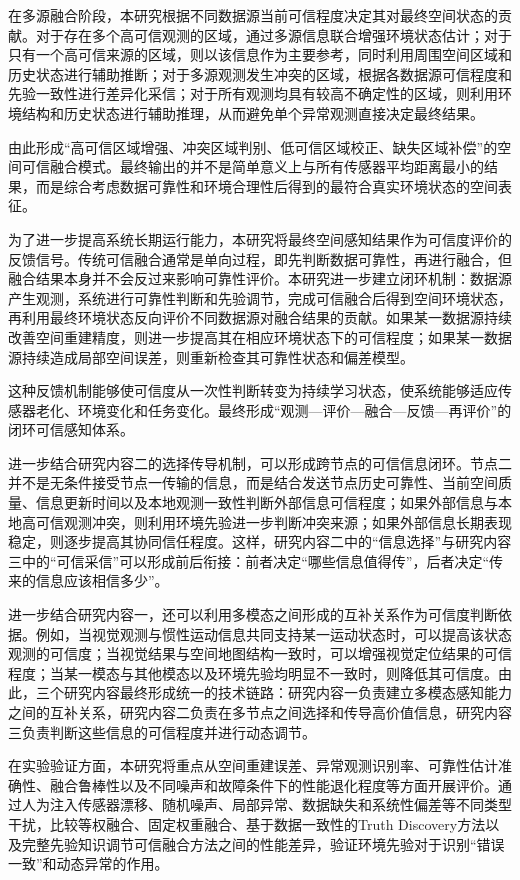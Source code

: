 在多源融合阶段，本研究根据不同数据源当前可信程度决定其对最终空间状态的贡献。对于存在多个高可信观测的区域，通过多源信息联合增强环境状态估计；对于只有一个高可信来源的区域，则以该信息作为主要参考，同时利用周围空间区域和历史状态进行辅助推断；对于多源观测发生冲突的区域，根据各数据源可信程度和先验一致性进行差异化采信；对于所有观测均具有较高不确定性的区域，则利用环境结构和历史状态进行辅助推理，从而避免单个异常观测直接决定最终结果。

由此形成“高可信区域增强、冲突区域判别、低可信区域校正、缺失区域补偿”的空间可信融合模式。最终输出的并不是简单意义上与所有传感器平均距离最小的结果，而是综合考虑数据可靠性和环境合理性后得到的最符合真实环境状态的空间表征。

为了进一步提高系统长期运行能力，本研究将最终空间感知结果作为可信度评价的反馈信号。传统可信融合通常是单向过程，即先判断数据可靠性，再进行融合，但融合结果本身并不会反过来影响可靠性评价。本研究进一步建立闭环机制：数据源产生观测，系统进行可靠性判断和先验调节，完成可信融合后得到空间环境状态，再利用最终环境状态反向评价不同数据源对融合结果的贡献。如果某一数据源持续改善空间重建精度，则进一步提高其在相应环境状态下的可信程度；如果某一数据源持续造成局部空间误差，则重新检查其可靠性状态和偏差模型。

这种反馈机制能够使可信度从一次性判断转变为持续学习状态，使系统能够适应传感器老化、环境变化和任务变化。最终形成“观测—评价—融合—反馈—再评价”的闭环可信感知体系。

进一步结合研究内容二的选择传导机制，可以形成跨节点的可信信息闭环。节点二并不是无条件接受节点一传输的信息，而是结合发送节点历史可靠性、当前空间质量、信息更新时间以及本地观测一致性判断外部信息可信程度；如果外部信息与本地高可信观测冲突，则利用环境先验进一步判断冲突来源；如果外部信息长期表现稳定，则逐步提高其协同信任程度。这样，研究内容二中的“信息选择”与研究内容三中的“可信采信”可以形成前后衔接：前者决定“哪些信息值得传”，后者决定“传来的信息应该相信多少”。

进一步结合研究内容一，还可以利用多模态之间形成的互补关系作为可信度判断依据。例如，当视觉观测与惯性运动信息共同支持某一运动状态时，可以提高该状态观测的可信度；当视觉结果与空间地图结构一致时，可以增强视觉定位结果的可信程度；当某一模态与其他模态以及环境先验均明显不一致时，则降低其可信度。由此，三个研究内容最终形成统一的技术链路：研究内容一负责建立多模态感知能力之间的互补关系，研究内容二负责在多节点之间选择和传导高价值信息，研究内容三负责判断这些信息的可信程度并进行动态调节。

在实验验证方面，本研究将重点从空间重建误差、异常观测识别率、可靠性估计准确性、融合鲁棒性以及不同噪声和故障条件下的性能退化程度等方面开展评价。通过人为注入传感器漂移、随机噪声、局部异常、数据缺失和系统性偏差等不同类型干扰，比较等权融合、固定权重融合、基于数据一致性的Truth Discovery方法以及完整先验知识调节可信融合方法之间的性能差异，验证环境先验对于识别“错误一致”和动态异常的作用。

